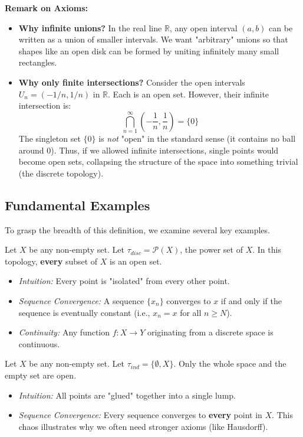 \documentclass[oneside]{book}
\begin{document}
\textbf{Remark on Axioms:}
\begin{itemize}
    \item \textbf{Why infinite unions?} In the real line $\mathbb{R}$, any open interval $(a, b)$ can be written as a union of smaller intervals. We want "arbitrary" unions so that shapes like an open disk can be formed by uniting infinitely many small rectangles.
    \item \textbf{Why only finite intersections?} Consider the open intervals $U_n = (-1/n, 1/n)$ in $\mathbb{R}$. Each is an open set. However, their infinite intersection is:
    \[ \bigcap_{n=1}^{\infty} \left(-\frac{1}{n}, \frac{1}{n}\right) = \{0\} \]
    The singleton set $\{0\}$ is \textit{not} "open" in the standard sense (it contains no ball around 0). Thus, if we allowed infinite intersections, single points would become open sets, collapsing the structure of the space into something trivial (the discrete topology).
\end{itemize}

\subsection{Fundamental Examples}

To grasp the breadth of this definition, we examine several key examples.

\begin{example}
Let $X$ be any non-empty set. Let $\tau_{disc} = \mathcal{P}(X)$, the power set of $X$.
In this topology, \textbf{every} subset of $X$ is an open set.
\begin{itemize}
    \item \textit{Intuition:} Every point is "isolated" from every other point.
    \item \textit{Sequence Convergence:} A sequence $\{x_n\}$ converges to $x$ if and only if the sequence is eventually constant (i.e., $x_n = x$ for all $n \ge N$).
    \item \textit{Continuity:} Any function $f: X \to Y$ originating from a discrete space is continuous.
\end{itemize}
\end{example}

\begin{example}
Let $X$ be any non-empty set. Let $\tau_{ind} = \{\emptyset, X\}$.
Only the whole space and the empty set are open.
\begin{itemize}
    \item \textit{Intuition:} All points are "glued" together into a single lump.
    \item \textit{Sequence Convergence:} Every sequence converges to \textbf{every} point in $X$. This chaos illustrates why we often need stronger axioms (like Hausdorff).
\end{itemize}
\end{example}
\end{document}
